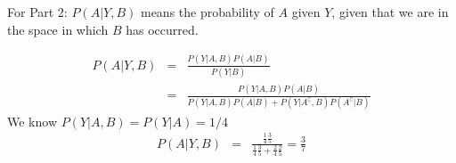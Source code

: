 \documentclass{article}
\newcommand{\ber}{\begin{eqnarray}}
\newcommand{\eer}{\end{eqnarray}}
\begin{document}
For Part 2: $P(A|Y,B)$ means the probability of $A$ given $Y$, given that we are in the space in which $B$ has occurred.

\ber
P(A|Y,B) &=& \frac{P(Y|A,B)P(A|B)}{P(Y|B)} \\
&=& \frac{P(Y|A,B)P(A|B)}{P(Y|A,B)P(A|B) + P(Y|A^\complement,B)P(A^\complement|B)}
\eer
We know $P(Y|A,B)=P(Y|A)=1/4$
\ber
P(A|Y,B) &=& \frac{\frac{1}{4}\frac{3}{5}}{\frac{1}{4}\frac{3}{5} + \frac{2}{4}\frac{2}{5}} = \frac{3}{7}
\eer
\end{document}

